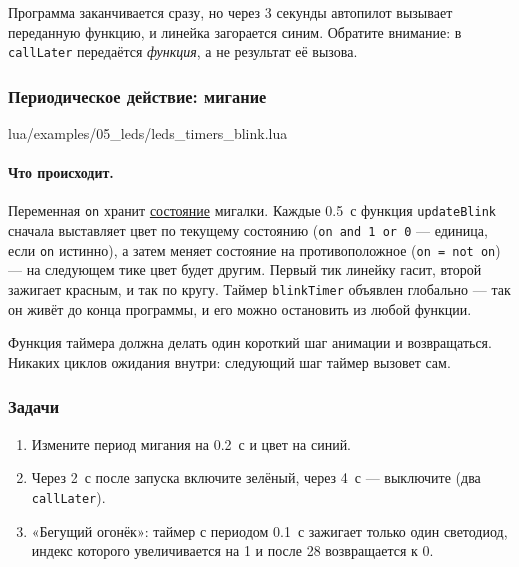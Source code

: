 Программа заканчивается сразу, но через 3 секунды автопилот вызывает переданную функцию, и линейка загорается синим. Обратите внимание: в \verb|callLater| передаётся \emph{функция}, а не результат её вызова.

\subsubsection*{Периодическое действие: мигание}

\begin{codefile}{lua/examples/05_leds/leds_timers_blink.lua}
\end{codefile}

\paragraph{Что происходит.} Переменная \verb|on| хранит \hyperlink{term:state}{состояние} мигалки. Каждые 0.5~с функция \verb|updateBlink| сначала выставляет цвет по текущему состоянию (\verb|on and 1 or 0| --- единица, если \verb|on| истинно), а затем меняет состояние на противоположное (\verb|on = not on|) --- на следующем тике цвет будет другим. Первый тик линейку гасит, второй зажигает красным, и так по кругу. Таймер \verb|blinkTimer| объявлен глобально --- так он живёт до конца программы, и его можно остановить из любой функции.

\begin{hintbox}
Функция таймера должна делать один короткий шаг анимации и возвращаться. Никаких циклов ожидания внутри: следующий шаг таймер вызовет сам.
\end{hintbox}

\subsubsection*{Задачи}
\begin{enumerate}
  \item Измените период мигания на 0.2~с и цвет на синий.
  \item Через 2~с после запуска включите зелёный, через 4~с --- выключите (два \verb|callLater|).
  \item «Бегущий огонёк»: таймер с периодом 0.1~с зажигает только один светодиод, индекс которого увеличивается на 1 и после 28 возвращается к 0.
\end{enumerate}
